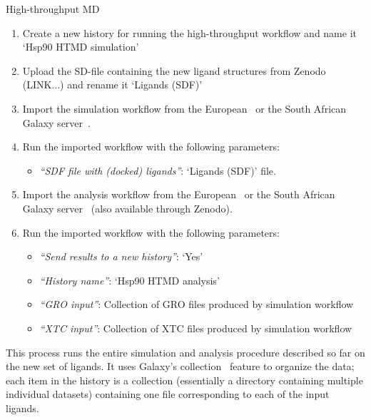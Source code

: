 \documentclass[twocolumn]{bmcart}%
\providecommand{\tightlist}{%
  \setlength{\itemsep}{0pt}\setlength{\parskip}{0pt}}
\begin{document}
\begin{handson_box_colour}{High-throughput MD}

\begin{enumerate}
\def\labelenumi{\arabic{enumi}.}
\tightlist
\item
  Create a new history for running the high-throughput workflow and name it `Hsp90 HTMD simulation'

\item
  Upload the SD-file containing the new ligand structures from Zenodo (LINK...) and rename it `Ligands (SDF)'
\item
  Import the simulation workflow from the European~\cite{eu_htmd_simulation_workflow} or the South African Galaxy server~\cite{za_htmd_simulation_workflow}.
\item
  Run the imported workflow with the following parameters:

  \begin{itemize}
  \tightlist
  \item
    \emph{``SDF file with (docked) ligands''}: `Ligands (SDF)' file.
  \end{itemize}
\item
  Import the analysis workflow from the European~\cite{eu_htmd_analysis_workflow} or the South African Galaxy server~\cite{za_htmd_analysis_workflow} (also available through Zenodo).
\item
  Run the imported workflow with the following parameters:
  \begin{itemize}
  \tightlist
  \item
    \emph{``Send results to a new history''}: `Yes'
  \item
    \emph{``History name''}: `Hsp90 HTMD analysis'
  \item
    \emph{``GRO input''}: Collection of GRO files produced by simulation workflow
  \item
    \emph{``XTC input''}: Collection of XTC files produced by simulation workflow
  \end{itemize}
\end{enumerate}
\end{handson_box_colour}

This process runs the entire simulation and analysis procedure described so far on the new set of ligands. It uses Galaxy's collection~\cite{gtn_collections} feature to organize the data; each item in the history is a collection (essentially a directory containing multiple individual datasets) containing one file corresponding to each of the input ligands.
\end{document}
